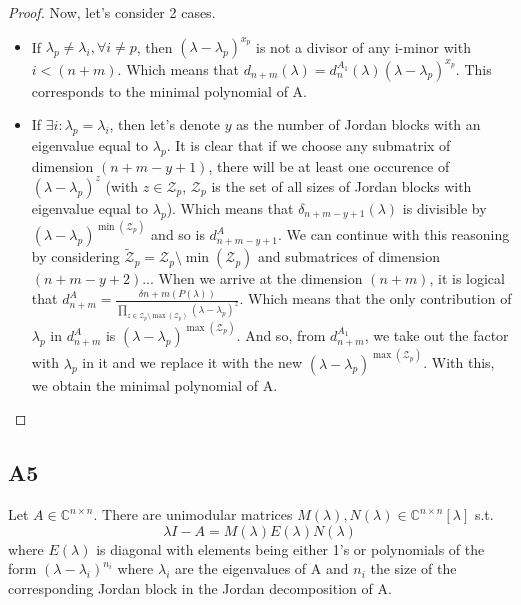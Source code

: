 \documentclass[11pt]{article}
\begin{document}
\begin{proof}
 Now, let's consider 2 cases.
 \begin{itemize}
 \item If $\lambda_p \neq \lambda_i , \forall i\neq p$, then $(\lambda - \lambda_p)^{x_p}$ is not a divisor of any i-minor with $i < (n+m)$. Which means that $d_{n+m}(\lambda) = d_{n}^{A_1}(\lambda) (\lambda - \lambda_p)^{x_p}$. This corresponds to the minimal polynomial of A.
 \item If $\exists i : \lambda_p = \lambda_i$, then let's denote $y$ as the number of Jordan blocks with an eigenvalue equal to $\lambda_p$. It is clear that if we choose any submatrix of dimension $(n+m-y+1)$, there will be at least one occurence of $(\lambda - \lambda_p)^{z}$ (with $ z \in \mathcal{Z}_p$, $\mathcal{Z}_p$ is the set of all sizes of Jordan blocks with eigenvalue equal to $\lambda_p$). Which means that $\delta_{n+m-y+1} (\lambda)$ is divisible by $(\lambda - \lambda_p)^{\min(\mathcal{Z}_p)}$ and so is $d_{n+m-y+1}^{A}$. We can continue with this reasoning by considering  $\tilde{\mathcal{Z}}_p =  \mathcal{Z}_p \setminus \min(\mathcal{Z}_p)$ and submatrices of dimension $(n+m-y+2)$... When we arrive at the dimension $(n+m)$, it is logical that $d_{n+m}^{A} = \frac{\delta{n+m}(P(\lambda))}{\prod_{z \in \mathcal{Z}_p\setminus \max{(\mathcal{Z}_p)}}(\lambda - \lambda_p)^{z}}$. Which means that the only contribution of $\lambda_p$ in $d_{n+m}^{A}$ is $(\lambda - \lambda_p)^{\max(\mathcal{Z}_p)}$. And so, from $d_{n+m}^{A_1}$, we take out the factor with $\lambda_p$ in it and we replace it with the new $(\lambda - \lambda_p)^{\max(\mathcal{Z}_p)}$. With this, we obtain the minimal polynomial of A.
 \end{itemize}
\end{proof}
\subsection*{A5}
Let $A\in \mathbb{C}^{n\times n}$. There are unimodular matrices $M(\lambda), N(\lambda) \in \mathbb{C}^{n\times n}[\lambda]$ s.t. 
\[\lambda I - A = M(\lambda)E(\lambda)N(\lambda)
\] where $E(\lambda)$ is diagonal with elements being either 1's or polynomials of the form $(\lambda - \lambda_i)^{n_i}$ where $ \lambda_i$ are the eigenvalues of A and $n_i$ the size of the corresponding Jordan block in the Jordan decomposition of A.
\end{document}
